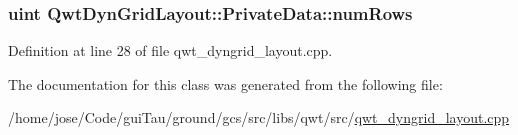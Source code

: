\hypertarget{class_qwt_dyn_grid_layout_1_1_private_data_a394b43e33ea0af77df5b2acc9acae2d7}{
\subsubsection[{num\-Rows}]{\setlength{\rightskip}{0pt plus 5cm}uint Qwt\-Dyn\-Grid\-Layout\-::\-Private\-Data\-::num\-Rows}}\label{class_qwt_dyn_grid_layout_1_1_private_data_a394b43e33ea0af77df5b2acc9acae2d7}


Definition at line 28 of file qwt\-\_\-dyngrid\-\_\-layout.\-cpp.



The documentation for this class was generated from the following file\-:\begin{DoxyCompactItemize}
\item 
/home/jose/\-Code/gui\-Tau/ground/gcs/src/libs/qwt/src/\hyperlink{qwt__dyngrid__layout_8cpp}{qwt\-\_\-dyngrid\-\_\-layout.\-cpp}\end{DoxyCompactItemize}
